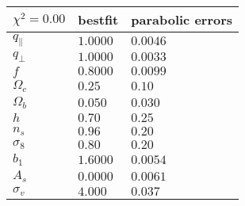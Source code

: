 \begin{tabular}{lll}
\hline
 $\chi^{2} = 0.00$   & bestfit   & parabolic errors   \\
\hline
 $q_{\parallel}$     & $1.0000$  & $0.0046$           \\
 $q_{\perp}$         & $1.0000$  & $0.0033$           \\
 $f$                 & $0.8000$  & $0.0099$           \\
 $\Omega_{c}$        & $0.25$    & $0.10$             \\
 $\Omega_{b}$        & $0.050$   & $0.030$            \\
 $h$                 & $0.70$    & $0.25$             \\
 $n_s$               & $0.96$    & $0.20$             \\
 $\sigma_{8}$        & $0.80$    & $0.20$             \\
 $b_{1}$             & $1.6000$  & $0.0054$           \\
 $A_{s}$             & $0.0000$  & $0.0061$           \\
 $\sigma_{v}$        & $4.000$   & $0.037$            \\
\hline
\end{tabular}